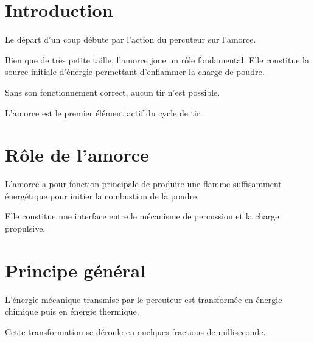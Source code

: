 
\section{Introduction}

Le départ d'un coup débute par l'action du percuteur sur l'amorce.

Bien que de très petite taille, l'amorce joue un rôle fondamental. Elle
constitue la source initiale d'énergie permettant d'enflammer la charge de
poudre.

Sans son fonctionnement correct, aucun tir n'est possible.

\begin{aretenir}

L'amorce est le premier élément actif du cycle de tir.

\end{aretenir}

\section{Rôle de l'amorce}

L'amorce a pour fonction principale de produire une flamme suffisamment
énergétique pour initier la combustion de la poudre.

Elle constitue une interface entre le mécanisme de percussion et la charge
propulsive.

\section{Principe général}

L'énergie mécanique transmise par le percuteur est transformée en énergie
chimique puis en énergie thermique.

Cette transformation se déroule en quelques fractions de milliseconde.

